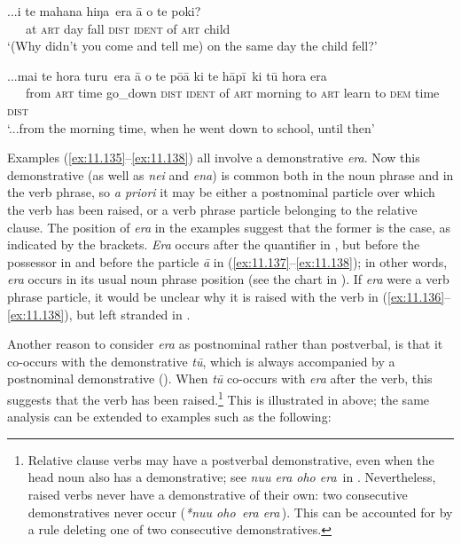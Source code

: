 \ea\label{ex:11.137}
\gll ...{\ꞌ}i te mahana {\ob}hiŋa\,{\cb} era {\ꞌ}ā o te poki? \\
~~~at \textsc{art} day {\db}fall \textsc{dist} \textsc{ident} of \textsc{art} child \\

\glt 
‘(Why didn’t you come and tell me) on the same day the child fell?’ \textstyleExampleref{[R313.106]} 
\z

\ea\label{ex:11.138}
\gll ...mai te hora {\ob}turu\,{\cb} era {\ꞌ}ā o te pō{\ꞌ}ā {\ob}ki te hāpī\,{\cb} ki tū hora era \\
~~~from \textsc{art} time {\db}go\_down \textsc{dist} \textsc{ident} of \textsc{art} morning {\db}to \textsc{art} learn to \textsc{dem} time \textsc{dist} \\

\glt
‘...from the morning time, when he went down to school, until then’ \textstyleExampleref{[R245.009]} 
\z

Examples (\ref{ex:11.135}–\ref{ex:11.138}) all involve a demonstrative \textit{era}. Now this demonstrative (as well as \textit{nei} and \textit{ena}) is common both in the noun phrase and in the verb phrase, so \textit{a priori} it may be either a postnominal particle over which the verb has been raised, or a verb phrase particle belonging to the relative clause. The position of \textit{era} in the examples suggest that the former is the case, as indicated by the brackets. \textit{Era} occurs after the quantifier in , but before the possessor in  and before the particle \textit{{\ꞌ}ā} in (\ref{ex:11.137}–\ref{ex:11.138}); in other words, \textit{era} occurs in its usual noun phrase position (see the chart in ). If \textit{era} were a verb phrase particle, it would be unclear why it is raised with the verb in (\ref{ex:11.136}–\ref{ex:11.138}), but left stranded in .

Another reason to consider \textit{era} as postnominal rather than postverbal, is that it co-occurs with the demonstrative \textit{tū}, which is always accompanied by a postnominal de\-mon\-strative (). When \textit{tū} co-occurs with \textit{era} after the verb, this suggests that the verb has been raised.\footnote{\label{fn:519}Relative clause verbs may have a postverbal demonstrative, even when the head noun also has a demonstrative; see \textit{nu{\ꞌ}u era {\ob}oho era\,{\cb}} in . Nevertheless, raised verbs never have a demonstrative of their own: two consecutive demonstratives never occur (\textit{*nu{\ꞌ}u {\ob}oho\,{\cb} era {\ob}era\,{\cb}}). This can be accounted for by a rule deleting one of two consecutive demonstratives.} This is illustrated in  above; the same analysis can be extended to examples such as the following:

